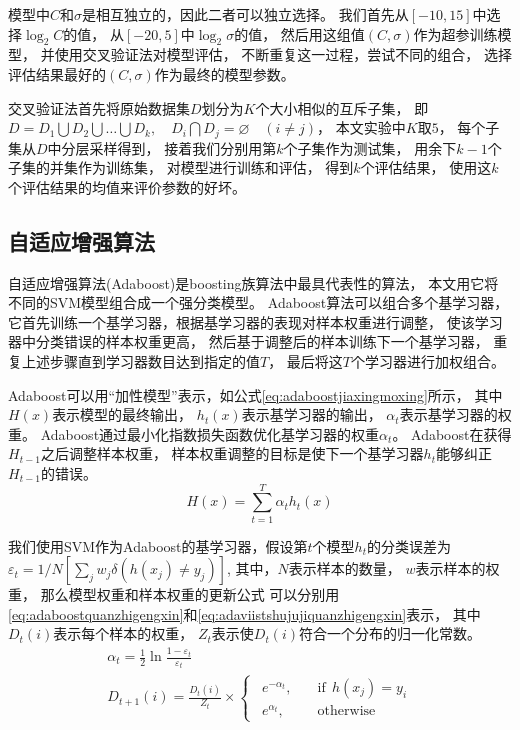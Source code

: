 模型中$C$和$\sigma$是相互独立的，因此二者可以独立选择。
我们首先从$[-10,15]$中选择$\log_2⁡C$的值，
从$[-20,5]$中$\log_2⁡\sigma$的值，
然后用这组值$(C,\sigma)$作为超参训练模型，
并使用交叉验证法对模型评估，
不断重复这一过程，尝试不同的组合，
选择评估结果最好的$(C,\sigma)$作为最终的模型参数。

交叉验证法首先将原始数据集$D$划分为$K$个大小相似的互斥子集，
即$D=D_1\bigcup D_2\bigcup \dots \bigcup D_k,\quad D_i\bigcap D_j=\varnothing \quad(i\not =j)$，
本文实验中$K$取$5$，
每个子集从$D$中分层采样得到，
接着我们分别用第$k$个子集作为测试集，
用余下$k-1$个子集的并集作为训练集，
对模型进行训练和评估，
得到$k$个评估结果，
使用这$k$个评估结果的均值来评价参数的好坏。

\subsection{自适应增强算法}
\label{subsection:adaboost}

自适应增强算法(Adaboost)是boosting族算法中最具代表性的算法，
本文用它将不同的SVM模型组合成一个强分类模型。
Adaboost算法可以组合多个基学习器，
它首先训练一个基学习器，根据基学习器的表现对样本权重进行调整，
使该学习器中分类错误的样本权重更高，
然后基于调整后的样本训练下一个基学习器，
重复上述步骤直到学习器数目达到指定的值$T$，
最后将这$T$个学习器进行加权组合。

Adaboost可以用“加性模型”表示，如公式\eqref{eq:adaboostjiaxingmoxing}所示，
其中$H(x)$表示模型的最终输出，
$h_t (x)$表示基学习器的输出，
$\alpha_t$表示基学习器的权重。
Adaboost通过最小化指数损失函数优化基学习器的权重$\alpha_t$。
Adaboost在获得$H_{t-1}$之后调整样本权重，
样本权重调整的目标是使下一个基学习器$h_t$能够纠正$H_{t-1}$的错误。
\begin{equation}
H(x)=\sum_{t=1}^T{\alpha_th_t(x)}
\label{eq:adaboostjiaxingmoxing}
\end{equation}

我们使用SVM作为Adaboost的基学习器，假设第$t$个模型$h_t$的分类误差为$\varepsilon_t=1/N\left[\sum_jw_j\delta(h(x_j)\not =y_j)\right]$,
其中，$N$表示样本的数量，
$w$表示样本的权重，
那么模型权重和样本权重的更新公式
可以分别用\eqref{eq:adaboostquanzhigengxin}和\eqref{eq:adaviistshujujiquanzhigengxin}表示，
其中$D_{t}(i)$表示每个样本的权重，
$Z_t$表示使$D_t(i)$符合一个分布的归一化常数。
\begin{gather}
\alpha_t=\frac{1}{2}\ln \frac{1-\varepsilon_t}{\varepsilon_t}  \label{eq:adaboostquanzhigengxin}\\
D_{t+1}(i)=\frac{D_t(i)}{Z_t}\times
\begin{cases}
 ~~e^{-\alpha_t},\quad &\mbox{if}~~h(x_j)=y_i\\
 ~~e^{\alpha_t},\quad &\mbox{otherwise} 
\end{cases}\label{eq:adaviistshujujiquanzhigengxin}
\end{gather}

